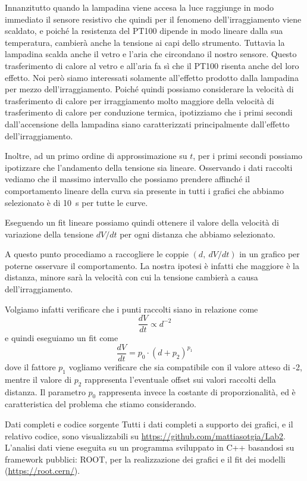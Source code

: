 \documentclass[
    rmp,
    reprint, 
    superscriptaddress, 
    altaffilletter, 
    amsmath, 
    amssymb,
    a4paper]{revtex4-2}
\begin{document}
Innanzitutto quando la lampadina viene accesa la luce raggiunge in modo immediato il sensore resistivo che quindi per il fenomeno dell'irraggiamento viene scaldato, e poiché la resistenza del PT100 dipende in modo lineare dalla sua temperatura, cambierà anche la tensione ai capi dello strumento. Tuttavia la lampadina scalda anche il vetro e l'aria che circondano il nostro sensore. Questo trasferimento di calore al vetro e all'aria fa sì che il PT100 risenta anche del loro effetto. Noi però siamo interessati solamente all'effetto prodotto dalla lampadina per mezzo dell'irraggiamento. Poiché quindi possiamo considerare la velocità di trasferimento di calore per irraggiamento molto maggiore della velocità di trasferimento di calore per conduzione termica, ipotizziamo che i primi secondi dall'accensione della lampadina siano caratterizzati principalmente dall'effetto dell'irraggiamento. 

Inoltre, ad un primo ordine di approssimazione su $t$, per i primi secondi possiamo ipotizzare che l'andamento della tensione sia lineare. Osservando i dati raccolti vediamo che il massimo intervallo che possiamo prendere affinché il comportamento lineare della curva sia presente in tutti i grafici che abbiamo selezionato è di \SI{10}{\second} per tutte le curve. 

Eseguendo un fit lineare possiamo quindi ottenere il valore della velocità di variazione della tensione $dV/dt$ per ogni distanza che abbiamo selezionato.

A questo punto procediamo a raccogliere le coppie $(d,~dV/dt)$ in un grafico per poterne osservare il comportamento. La nostra ipotesi è infatti che maggiore è la distanza, minore sarà la velocità con cui la tensione cambierà a causa dell'irraggiamento. 

Volgiamo infatti verificare che i punti raccolti siano in relazione come 
\[
    \frac{dV}{dt} \propto d^{-2}
\]
e quindi eseguiamo un fit come
\[
    \frac{dV}{dt} = p_0\cdot(d+p_2)^{p_1}
\]
dove il fattore $p_1$ vogliamo verificare che sia compatibile con il valore atteso di -2, mentre il valore di $p_2$ rappresenta l'eventuale offset sui valori raccolti della distanza. Il parametro $p_0$ rappresenta invece la costante di proporzionalità, ed è caratteristica del problema che stiamo considerando.


\begin{methods}{D\lowercase{ati completi e codice sorgente}}
    Tutti i dati completi a supporto dei grafici, e il relativo codice, sono visualizzabili su \url{https://github.com/mattiasotgia/Lab2}. L'analisi dati viene eseguita su un programma sviluppato in C++ basandosi su framework pubblici: ROOT, per la realizzazione dei grafici e il fit dei modelli (\url{https://root.cern/}).
\end{methods}
\end{document}
